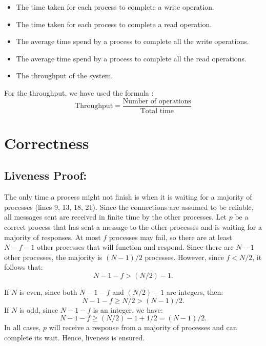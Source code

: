\documentclass{article}
\begin{document}
\begin{itemize}
    \item The time taken for each process to complete a write operation.
    \item The time taken for each process to complete a read operation.
    \item The average time spend by a process to complete all the write operations.
    \item The average time spend by a process to complete all the read operations.
    \item The throughput of the system.
\end{itemize}

For the throughput, we have used the formula :
$$
\text{Throughput} = \frac{\text{Number of operations}}{\text{Total time}}
$$

\newpage
\section{Correctness}

\subsection{Liveness Proof:}
The only time a process might not finish is when it is waiting for a majority of processes (lines 9, 13, 18, 21). Since the connections are assumed to be reliable, all messages sent are received in finite time by the other processes. Let $p$ be a correct process that has sent a message to the other processes and is waiting for a majority of responses. At most $f$ processes may fail, so there are at least $N - f - 1$ other processes that will function and respond. Since there are $N - 1$ other processes, the majority is $(N - 1)/2$ processes. However, since $f < N/2$, it follows that:
\[
N - 1 - f > (N / 2) - 1.
\]

If $N$ is even, since both $N - 1 - f$ and $(N / 2) - 1$ are integers, then:
\[
N - 1 - f \geq N / 2 > (N - 1) / 2.
\]
If $N$ is odd, since $N - 1 - f$ is an integer, we have:
\[
N - 1 - f \geq (N / 2) - 1 + 1/2 = (N - 1) / 2.
\]
In all cases, $p$ will receive a response from a majority of processes and can complete its wait. Hence, liveness is ensured.
\end{document}
